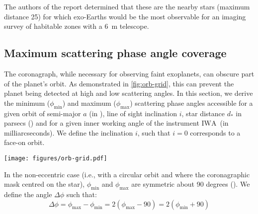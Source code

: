 \documentclass[
    usenatbib,
]{mnras}
\newcommand{\IWA}{\ensuremath{\mathrm{IWA}}}
\begin{document}
The authors of the report determined that these are the nearby stars (maximum distance \SI{25}{\parsec}) for which exo-Earths would be the most observable for an imaging survey of habitable zones with a \SI{6}{\meter} telescope.



\subsection{Maximum scattering phase angle coverage}
\label{sec:Delta_phi}

The coronagraph, while necessary for observing faint exoplanets, can obscure part of the planet's orbit. 
As demonstrated in \cref{fig:orb-grid}, this can prevent the planet being detected at high and low scattering angles. 
In this section, we derive the minimum ($\phi_\mathrm{min}$) and maximum ($\phi_\mathrm{max}$) scattering phase angles accessible for a given orbit of semi-major $a$ (in \si{\au}), line of sight inclination $i$, star distance $d_*$ in parsecs (\si{\parsec}) and for a given inner working angle of the instrument \IWA\ (in milliarcseconds). 
We define the inclination $i$, such that $i=0$ corresponds to a face-on orbit. 

\begin{figure*}%
   \centering
   \texttt{[image: figures/orb-grid.pdf]}
   \caption{
        The scattering phase angles accessible to a direct imaging mission can be limited by orbital inclination or by the coronagraphic inner working angle. 
        If the orbital inclination is close to face-on (top panels) then the scattering phase angles probed throughout an orbit are limited by inclination; for circular orbits accessible scattering phases are $\phi \in 90^\circ \pm i$. 
        For orbital inclinations close to edge-on (bottom panels) the planet goes through all phases, but the scattering phase angles near 0$^\circ$ and 180$^\circ$ are not accessible due to obscuration by the coronagraph mask; for circular orbits, the accessible scattering phases are $\phi \in 90^\circ \pm \arcsin({\rm IWA}\cdot d_*/a)$.
    }
    \label{fig:orb-grid}
\end{figure*}

In the non-eccentric case (i.e., with a circular orbit and where the coronagraphic mask centred on the star), $\phi_\mathrm{min}$ and $\phi_\mathrm{max}$ are symmetric about 90 degrees (). 
We define the angle $\Delta \phi$ such that: 
\begin{equation}
    \label{eq:Delta_phi}
    \Delta \phi 
    = \phi_\mathrm{max} - \phi_\mathrm{min}
    =  2(\phi_\mathrm{max} - 90) 
    =  2(\phi_\mathrm{min} + 90)
\end{equation}
\end{document}
